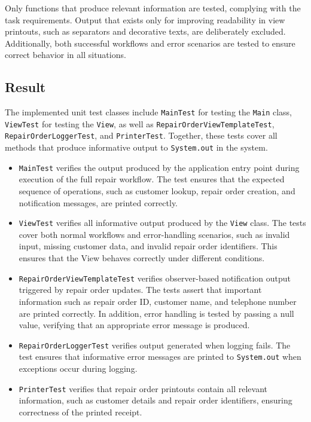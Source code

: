 \documentclass[a4paper]{scrartcl}
\begin{document}
Only functions that produce relevant information are tested, complying with the task requirements. Output that exists only for improving readability in view printouts, such as separators and decorative texts, are deliberately excluded. Additionally, both successful workflows and error scenarios are tested to ensure correct behavior in all situations.

\subsection{Result}

The implemented unit test classes include \texttt{MainTest} for testing the \texttt{Main} class, \texttt{ViewTest} for testing the \texttt{View}, as well as \texttt{RepairOrderViewTemplateTest}, \texttt{RepairOrderLoggerTest}, and \texttt{PrinterTest}. Together, these tests cover all methods that produce informative output to \texttt{System.out} in the system.

\begin{itemize}
    \item \texttt{MainTest} verifies the output produced by the application entry point during execution of the full repair workflow. The test ensures that the expected sequence of operations, such as customer lookup, repair order creation, and notification messages, are printed correctly.

    \item \texttt{ViewTest} verifies all informative output produced by the \texttt{View} class. The tests cover both normal workflows and error-handling scenarios, such as invalid input, missing customer data, and invalid repair order identifiers. This ensures that the View behaves correctly under different conditions.

    \item \texttt{RepairOrderViewTemplateTest} verifies observer-based notification output triggered by repair order updates. The tests assert that important information such as repair order ID, customer name, and telephone number are printed correctly. In addition, error handling is tested by passing a null value, verifying that an appropriate error message is produced.

    \item \texttt{RepairOrderLoggerTest} verifies output generated when logging fails. The test ensures that informative error messages are printed to \texttt{System.out} when exceptions occur during logging.

    \item \texttt{PrinterTest} verifies that repair order printouts contain all relevant information, such as customer details and repair order identifiers, ensuring correctness of the printed receipt.
\end{itemize}
\end{document}
